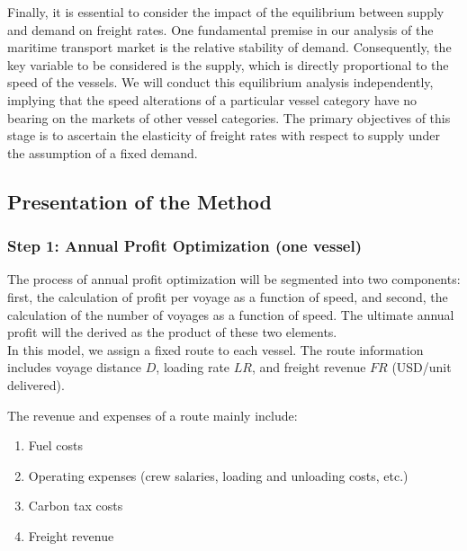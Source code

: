 \documentclass[a4paper,12pt]{article}
\begin{document}
Finally, it is essential to consider the impact of the equilibrium between supply and demand on freight rates.
One fundamental premise in our analysis of the maritime transport market is the relative stability of demand.
Consequently, the key variable to be considered is the supply, which is directly proportional to the speed of the vessels. We will conduct this equilibrium analysis independently, implying that the speed alterations of a particular vessel category have no bearing on the markets of other vessel categories.
The primary objectives of this stage is to ascertain the elasticity of freight rates with respect to supply under the assumption of a fixed demand.\\


\subsection{Presentation of the Method}
\subsubsection{Step 1: Annual Profit Optimization (one vessel)}

The process of annual profit optimization will be segmented into two components: first, the calculation of profit per voyage as a function of speed, and second, the calculation of the number of voyages as a function of speed.
The ultimate annual profit will the derived as the product of these two elements.\\

In this model, we assign a fixed route to each vessel. The route information includes voyage distance $D$, loading rate $LR$, and freight revenue $FR$ (USD/unit delivered).

The revenue and expenses of a route mainly include:
\begin{enumerate}
	\item Fuel costs
	\item Operating expenses (crew salaries, loading and unloading costs, etc.)
	\item Carbon tax costs
	\item Freight revenue
\end{enumerate}
\end{document}
